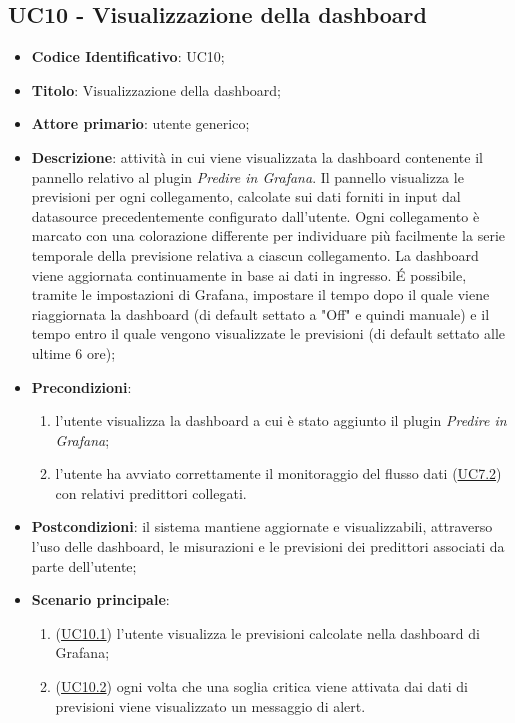 
	\label{par:UC10}
	\subsection{UC10 - Visualizzazione della dashboard}


		\begin{itemize}
			\item\textbf{Codice Identificativo}: UC10;
			\item\textbf{Titolo}: Visualizzazione della dashboard;
			\item\textbf{Attore primario}: utente generico;
			\item\textbf{Descrizione}: attività in cui viene visualizzata la dashboard contenente il pannello relativo al plugin \textit{Predire in Grafana}. Il pannello visualizza le previsioni per ogni collegamento, calcolate sui dati forniti in input dal datasource precedentemente configurato dall'utente. Ogni collegamento è marcato con una colorazione differente per individuare più facilmente la serie temporale della previsione relativa a ciascun collegamento. La dashboard viene aggiornata continuamente in base ai dati in ingresso. \'E possibile, tramite le impostazioni di Grafana, impostare il tempo dopo il quale viene riaggiornata la dashboard (di default settato a "Off" e quindi manuale) e il tempo entro il quale vengono visualizzate le previsioni (di default settato alle ultime 6 ore); 
			\item\textbf{Precondizioni}: 
			\begin{enumerate}
				\item l'utente visualizza la dashboard a cui è stato aggiunto il plugin \textit{Predire in Grafana};
				\item l'utente ha avviato correttamente il monitoraggio del flusso dati (\hyperref[par:UC7.2]{UC7.2}) con relativi predittori collegati.
			\end{enumerate}				
			\item\textbf{Postcondizioni}: il sistema mantiene aggiornate e visualizzabili, attraverso l'uso delle dashboard, le misurazioni e le previsioni dei predittori associati da parte dell'utente;
			\item\textbf{Scenario principale}: 
			\begin{enumerate}
				\item (\hyperref[par:UC10.1]{UC10.1}) l'utente visualizza le previsioni calcolate nella dashboard di Grafana;
				\item (\hyperref[par:UC10.2]{UC10.2}) ogni volta che una soglia critica viene attivata dai dati di previsioni viene visualizzato un messaggio di alert.
			\end{enumerate}
				
		\end{itemize}
		
